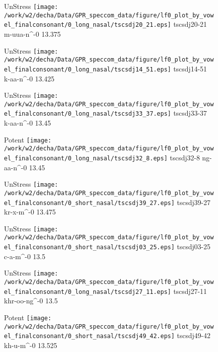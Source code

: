 \documentclass{article}
\begin{document}
\begin{figure}[t]
\begin{minipage}[b]{.24\textwidth}
UnStress
\centering
\texttt{[image: /work/w2/decha/Data/GPR\_speccom\_data/figure/lf0\_plot\_by\_vowel\_finalconsonant/0\_long\_nasal/tscsdj20\_21.eps]}
tscsdj20-21 m-uua-n\textasciicircum-0 13.375
\end{minipage}
\begin{minipage}[b]{.24\textwidth}
UnStress
\centering
\texttt{[image: /work/w2/decha/Data/GPR\_speccom\_data/figure/lf0\_plot\_by\_vowel\_finalconsonant/0\_long\_nasal/tscsdj14\_51.eps]}
tscsdj14-51 k-aa-n\textasciicircum-0 13.425
\end{minipage}
\begin{minipage}[b]{.24\textwidth}
UnStress
\centering
\texttt{[image: /work/w2/decha/Data/GPR\_speccom\_data/figure/lf0\_plot\_by\_vowel\_finalconsonant/0\_long\_nasal/tscsdj33\_37.eps]}
tscsdj33-37 k-aa-n\textasciicircum-0 13.45
\end{minipage}
\begin{minipage}[b]{.24\textwidth}
\colorbox{Apricot}{Potent}
\centering
\texttt{[image: /work/w2/decha/Data/GPR\_speccom\_data/figure/lf0\_plot\_by\_vowel\_finalconsonant/0\_long\_nasal/tscsdj32\_8.eps]}
tscsdj32-8 ng-aa-n\textasciicircum-0 13.45
\end{minipage}
\end{figure}

\begin{figure}[t]
\begin{minipage}[b]{.24\textwidth}
UnStress
\centering
\texttt{[image: /work/w2/decha/Data/GPR\_speccom\_data/figure/lf0\_plot\_by\_vowel\_finalconsonant/0\_short\_nasal/tscsdj39\_27.eps]}
tscsdj39-27 kr-x-m\textasciicircum-0 13.475
\end{minipage}
\begin{minipage}[b]{.24\textwidth}
UnStress
\centering
\texttt{[image: /work/w2/decha/Data/GPR\_speccom\_data/figure/lf0\_plot\_by\_vowel\_finalconsonant/0\_short\_nasal/tscsdj03\_25.eps]}
tscsdj03-25 c-a-m\textasciicircum-0 13.5
\end{minipage}
\begin{minipage}[b]{.24\textwidth}
UnStress
\centering
\texttt{[image: /work/w2/decha/Data/GPR\_speccom\_data/figure/lf0\_plot\_by\_vowel\_finalconsonant/0\_long\_nasal/tscsdj27\_11.eps]}
tscsdj27-11 khr-oo-ng\textasciicircum-0 13.5
\end{minipage}
\begin{minipage}[b]{.24\textwidth}
\colorbox{Apricot}{Potent}
\centering
\texttt{[image: /work/w2/decha/Data/GPR\_speccom\_data/figure/lf0\_plot\_by\_vowel\_finalconsonant/0\_short\_nasal/tscsdj49\_42.eps]}
tscsdj49-42 kh-u-m\textasciicircum-0 13.525
\end{minipage}
\end{figure}
\end{document}

